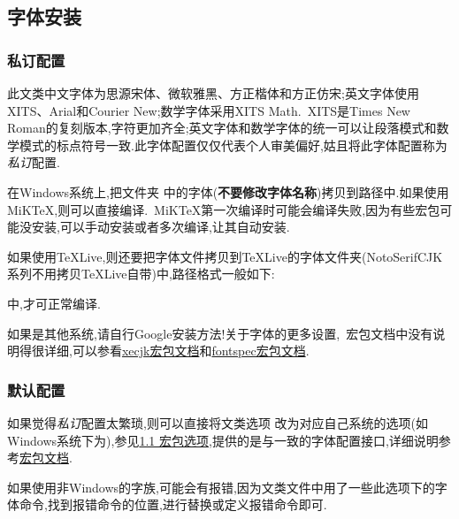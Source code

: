 \documentclass[list,answers,csize4,custom]{sysuexam}
\begin{document}
\subsection{字体安装}
\subsubsection{私订配置}
此文类中文字体为思源宋体、微软雅黑、方正楷体和方正仿宋;英文字体使用XITS、Arial和Courier New;数学字体采用XITS Math.~XITS是Times New Roman的复刻版本,字符更加齐全;英文字体和数学字体的统一可以让段落模式和数学模式的标点符号一致.此字体配置仅仅代表个人审美偏好,姑且将此字体配置称为\textit{私订}配置.

在Windows系统上,把文件夹  中的字体(\textbf{不要修改字体名称})拷贝到路径中.如果使用MiK\TeX{},则可以直接编译.~MiK\TeX{}第一次编译时可能会编译失败,因为有些宏包可能没安装,可以手动安装或者多次编译,让其自动安装.

如果使用\TeX{}Live,则还要把字体文件拷贝到\TeX{}Live的字体文件夹(NotoSerifCJK系列不用拷贝\TeX{}Live自带)中,路径格式一般如下:\par
{}\par
\noindent 中,才可正常编译.

如果是其他系统,请自行Google安装方法!关于字体的更多设置,~\CTeX{}宏包文档中没有说明得很详细,可以参看\href{http://mirrors.ctan.org/macros/xetex/latex/xecjk/xeCJK.pdf}{xecjk宏包文档}和\href{http://mirrors.ctan.org/macros/unicodetex/latex/fontspec/fontspec.pdf}{fontspec宏包文档}.

\subsubsection{默认配置}
如果觉得\textit{私订}配置太繁琐,则可以直接将文类选项  改为对应自己系统的选项(如Windows系统下为),参见\hyperlink{hbxx}{1.1 宏包选项},提供的是与\CTeX{}一致的字体配置接口,详细说明参考\href{http://mirrors.ctan.org/language/chinese/ctex/ctex.pdf}{\CTeX{}宏包文档}.

如果使用非Windows的字族,可能会有报错,因为文类文件中用了一些此选项下的字体命令,找到报错命令的位置,进行替换或定义报错命令即可.
\end{document}
